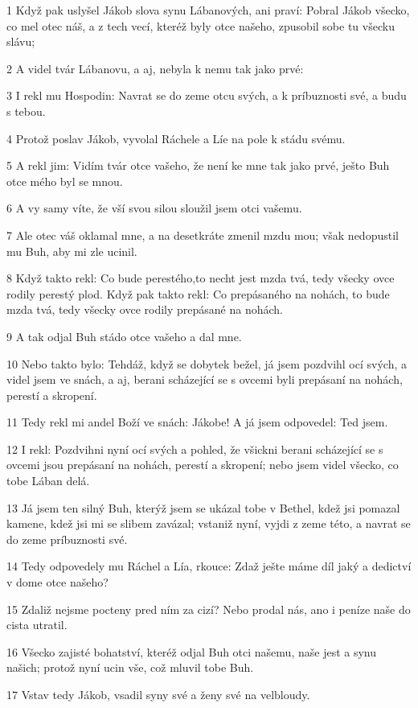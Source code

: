 \par 1 Když pak uslyšel Jákob slova synu Lábanových, ani praví: Pobral Jákob všecko, co mel otec náš, a z tech vecí, kteréž byly otce našeho, zpusobil sobe tu všecku slávu;
\par 2 A videl tvár Lábanovu, a aj, nebyla k nemu tak jako prvé:
\par 3 I rekl mu Hospodin: Navrat se do zeme otcu svých, a k príbuznosti své, a budu s tebou.
\par 4 Protož poslav Jákob, vyvolal Ráchele a Líe na pole k stádu svému.
\par 5 A rekl jim: Vidím tvár otce vašeho, že není ke mne tak jako prvé, ješto Buh otce mého byl se mnou.
\par 6 A vy samy víte, že vší svou silou sloužil jsem otci vašemu.
\par 7 Ale otec váš oklamal mne, a na desetkráte zmenil mzdu mou; však nedopustil mu Buh, aby mi zle ucinil.
\par 8 Když takto rekl: Co bude perestého,to necht jest mzda tvá, tedy všecky ovce rodily perestý plod. Když pak takto rekl: Co prepásaného na nohách, to bude mzda tvá, tedy všecky ovce rodily prepásané na nohách.
\par 9 A tak odjal Buh stádo otce vašeho a dal mne.
\par 10 Nebo takto bylo: Tehdáž, když se dobytek bežel, já jsem pozdvihl ocí svých, a videl jsem ve snách, a aj, berani scházející se s ovcemi byli prepásaní na nohách, perestí a skropení.
\par 11 Tedy rekl mi andel Boží ve snách: Jákobe! A já jsem odpovedel: Ted jsem.
\par 12 I rekl: Pozdvihni nyní ocí svých a pohled, že všickni berani scházející se s ovcemi jsou prepásaní na nohách, perestí a skropení; nebo jsem videl všecko, co tobe Lában delá.
\par 13 Já jsem ten silný Buh, kterýž jsem se ukázal tobe v Bethel, kdež jsi pomazal kamene, kdež jsi mi se slibem zavázal; vstaniž nyní, vyjdi z zeme této, a navrat se do zeme príbuznosti své.
\par 14 Tedy odpovedely mu Ráchel a Lía, rkouce: Zdaž ješte máme díl jaký a dedictví v dome otce našeho?
\par 15 Zdaliž nejsme pocteny pred ním za cizí? Nebo prodal nás, ano i peníze naše do cista utratil.
\par 16 Všecko zajisté bohatství, kteréž odjal Buh otci našemu, naše jest a synu našich; protož nyní ucin vše, což mluvil tobe Buh.
\par 17 Vstav tedy Jákob, vsadil syny své a ženy své na velbloudy.
